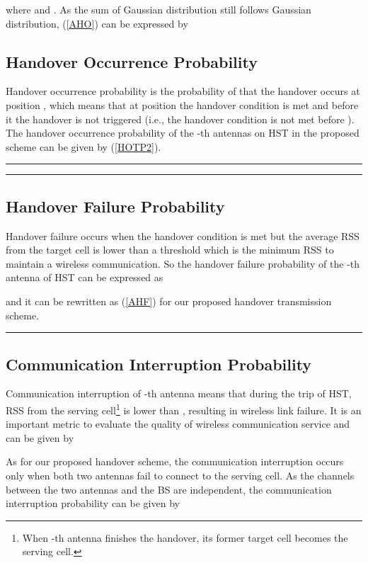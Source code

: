 \documentclass[a4paper,twocolumn,10pt]{IEEEtran}
\newcommand{\picspace}{{\vspace{-0.1 in}}}
\begin{document}
where  and . As the sum of Gaussian distribution still follows Gaussian distribution, (\ref{AHO}) can be expressed by


\subsection{Handover Occurrence Probability}

Handover occurrence probability is the probability of that the handover occurs at position , which means that at position  the handover condition is met and before it the handover is not triggered (i.e., the handover condition is not met before ). The handover occurrence probability of the -th antennas on HST in the proposed scheme can be given by (\ref{HOTP2}).

\begin{figure*}[!hb]
\picspace
\hrule

\hrule
\picspace
\end{figure*}

\subsection{Handover Failure Probability}
Handover failure occurs when the handover condition is met but the average RSS from the target cell is lower than a threshold  which is the minimum RSS to maintain a wireless communication. So the handover failure probability of the -th antenna of HST can be expressed as

and it can be rewritten as (\ref{AHF}) for our proposed handover transmission scheme.
\begin{figure*}[!ht]
\picspace

\hrule
\end{figure*}

\subsection{Communication Interruption Probability}

Communication interruption of -th antenna means that during the trip of HST, RSS from the serving cell\footnote{When -th antenna finishes the handover, its former target cell becomes the serving cell.} is lower than , resulting in  wireless link failure. It is an important metric to evaluate the quality of wireless communication service and can be given by


As for our proposed handover scheme, the communication interruption occurs only when both two antennas fail to connect to the serving cell. As the channels between the two antennas and the BS are independent, the communication interruption probability can be given by
\end{document}
